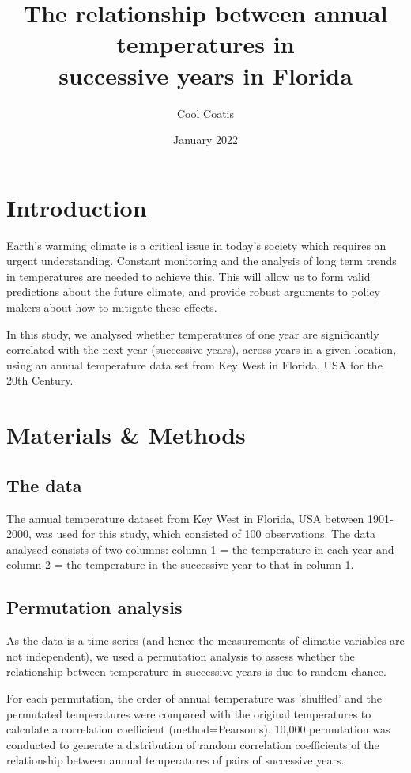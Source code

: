 \documentclass{article}
\title{The relationship between annual temperatures in \protect\\successive years in Florida}
\author{Cool Coatis}
\date{January 2022}
\begin{document}
	
	\maketitle
	
	\section{Introduction}
	
	Earth's warming climate is a critical issue in today's society which requires an urgent understanding. Constant monitoring and the analysis of long term trends in temperatures are needed to achieve this. This will allow us to form valid predictions about the future climate, and provide robust arguments to policy makers about how to mitigate these effects.
	
	In this study, we analysed whether temperatures of one year are significantly correlated with the next year (successive years), across years in a given location, using an annual temperature data set from Key West in Florida, USA for the 20th Century.
	
	\section{Materials \& Methods}
	
	\subsection{The data}
	
	The annual temperature dataset from Key West in Florida, USA between 1901-2000, was used for this study, which consisted of 100 observations. The data analysed consists of two columns: column 1 = the temperature in each year and column 2 = the temperature in the successive year to that in column 1.
	
	\subsection{Permutation analysis}
	
	As the data is a time series (and hence the measurements of climatic variables are not independent), we used a permutation analysis to assess whether the relationship between temperature in successive years is due to random chance.
	
For each permutation, the order of annual temperature was 'shuffled' and the permutated temperatures were compared with the original temperatures to calculate a correlation coefficient (method=Pearson's). 10,000 permutation was conducted to generate a distribution of random correlation coefficients of the relationship between annual temperatures of pairs of successive years.
	
\end{document}
